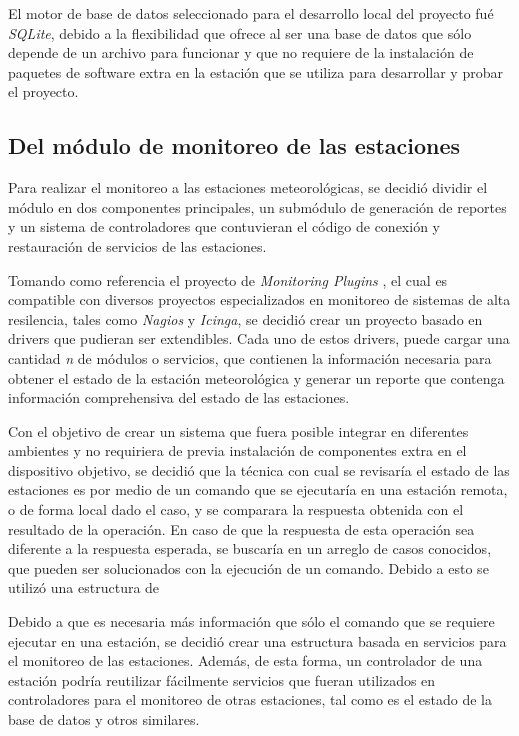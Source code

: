 El motor de base de datos seleccionado para el desarrollo local del proyecto fué \textit{SQLite}, debido a la flexibilidad que ofrece al ser una base de datos que sólo depende de un archivo para funcionar y que no requiere de la instalación de paquetes de software extra en la estación que se utiliza para desarrollar y probar el proyecto.


\subsection{Del módulo de monitoreo de las estaciones}

Para realizar el monitoreo a las estaciones meteorológicas, se decidió dividir el módulo en dos componentes principales, un submódulo de generación de reportes y un sistema de controladores que contuvieran el código de conexión y restauración de servicios de las estaciones.

Tomando como referencia el proyecto de \textit{Monitoring Plugins} \cite{monitoring_plugins}, el cual es compatible con diversos proyectos especializados en monitoreo de sistemas de alta resilencia, tales como \textit{Nagios} y \textit{Icinga}, se decidió crear un proyecto basado en drivers que pudieran ser extendibles. Cada uno de estos drivers, puede cargar una cantidad \textit{n} de módulos o servicios, que contienen la información necesaria para obtener el estado de la estación meteorológica y generar un reporte que contenga información comprehensiva del estado de las estaciones.

Con el objetivo de crear un sistema que fuera posible integrar en diferentes ambientes y no requiriera de previa instalación de componentes extra en el dispositivo objetivo, se decidió que la técnica con cual se revisaría el estado de las estaciones es por medio de un comando que se ejecutaría en una estación remota, o de forma local dado el caso, y se comparara la respuesta obtenida con el resultado de la operación. En caso de que la respuesta de esta operación sea diferente a la respuesta esperada, se buscaría en un arreglo de casos conocidos, que pueden ser solucionados con la ejecución de un comando.
Debido a esto se utilizó una estructura de

Debido a que es necesaria más información que sólo el comando que se requiere ejecutar en una estación, se decidió crear una estructura basada en servicios para el monitoreo de las estaciones. Además, de esta forma, un controlador de una estación podría reutilizar fácilmente servicios que fueran utilizados en controladores para el monitoreo de otras estaciones, tal como es el estado de la base de datos y otros similares.

